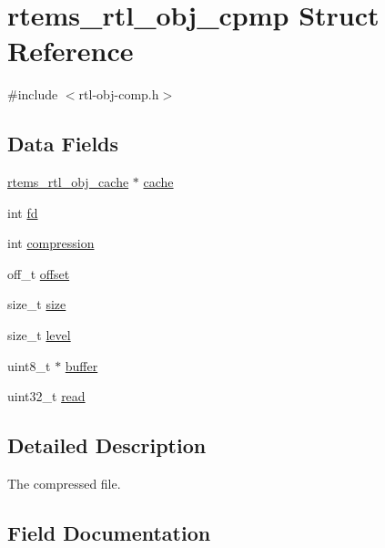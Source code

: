 \hypertarget{structrtems__rtl__obj__cpmp}{}\section{rtems\+\_\+rtl\+\_\+obj\+\_\+cpmp Struct Reference}
\label{structrtems__rtl__obj__cpmp}


{\ttfamily \#include $<$rtl-\/obj-\/comp.\+h$>$}

\subsection*{Data Fields}
\begin{DoxyCompactItemize}
\item 
\mbox{\hyperlink{structrtems__rtl__obj__cache}{rtems\+\_\+rtl\+\_\+obj\+\_\+cache}} $\ast$ \mbox{\hyperlink{structrtems__rtl__obj__cpmp_a652365afd3086b45c19e8dde6bcf9451}{cache}}
\item 
int \mbox{\hyperlink{structrtems__rtl__obj__cpmp_a8d547920ce84ab7b57e61cf803e77ab2}{fd}}
\item 
int \mbox{\hyperlink{structrtems__rtl__obj__cpmp_a4cedc8c6e2e06ab231ebac1e12393982}{compression}}
\item 
off\+\_\+t \mbox{\hyperlink{structrtems__rtl__obj__cpmp_af1a66e96bb39b71256675bb98ac9f70d}{offset}}
\item 
size\+\_\+t \mbox{\hyperlink{structrtems__rtl__obj__cpmp_a2001d894253092d12efe50cf9ce50520}{size}}
\item 
size\+\_\+t \mbox{\hyperlink{structrtems__rtl__obj__cpmp_ac283fe5f6a38bdeff4628d1eb915e528}{level}}
\item 
uint8\+\_\+t $\ast$ \mbox{\hyperlink{structrtems__rtl__obj__cpmp_a681d7c502ec608924f7f61c3b007a498}{buffer}}
\item 
uint32\+\_\+t \mbox{\hyperlink{structrtems__rtl__obj__cpmp_ab7be1734b384a5fc89d607fd7fbe24fe}{read}}
\end{DoxyCompactItemize}


\subsection{Detailed Description}
The compressed file. 

\subsection{Field Documentation}
\mbox{\label{structrtems__rtl__obj__cpmp_a681d7c502ec608924f7f61c3b007a498}} 
